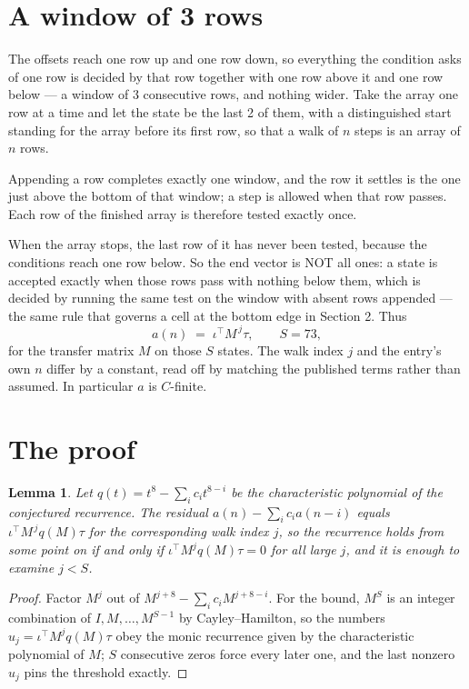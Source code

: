\documentclass[11pt,a4paper]{article}
\theoremstyle{plain}
\newtheorem{lemma}[theorem]{Lemma}
\theoremstyle{definition}
\begin{document}
\section{A window of 3 rows}

The offsets reach one row up and one row down, so everything the condition asks of one row is
decided by that row together with one row above it and one row below --- a window of
$3$ consecutive rows, and nothing wider. Take the array one row at a time and
let the state be the last 2 of them, with a distinguished start standing for the array before its
first row, so that a walk of $n$ steps is an array of $n$ rows.

Appending a row completes exactly one window, and the row it settles is the one just above the bottom of that window; a step is
allowed when that row passes. Each row of the finished array is therefore tested exactly once.

When the array stops, the last row of it has never been tested, because the
conditions reach one row below. So the end vector is NOT all ones: a state is accepted exactly when
those rows pass with nothing below them, which is decided by running the same test on the window
with absent rows appended --- the same rule that governs a cell at the bottom edge in
Section 2.
Thus
\[
a(n)\;=\;\iota^{\!\top}M^{\,j}\tau ,\qquad S=73,
\]
for the transfer matrix $M$ on those $S$ states. The walk index $j$ and the entry's own $n$
differ by a constant, read off by matching the published terms rather than assumed. In
particular $a$ is $C$-finite.

\section{The proof}

\begin{lemma}\label{lem:crit}
Let $q(t)=t^{8}-\sum_i c_it^{8-i}$ be the characteristic polynomial of the
conjectured recurrence. The residual $a(n)-\sum_ic_ia(n-i)$ equals
$\iota^{\!\top}M^{\,j}q(M)\tau$ for the corresponding walk index $j$, so the recurrence
holds from some point on if and only if $\iota^{\!\top}M^{j}q(M)\tau=0$ for all large $j$,
and it is enough to examine $j<S$.
\end{lemma}

\begin{proof}
Factor $M^{j}$ out of $M^{j+8}-\sum_ic_iM^{j+8-i}$. For the bound, $M^{S}$
is an integer combination of $I,M,\dots,M^{S-1}$ by Cayley--Hamilton, so the numbers
$u_j=\iota^{\!\top}M^{j}q(M)\tau$ obey the monic recurrence given by the characteristic
polynomial of $M$; $S$ consecutive zeros force every later one, and the last nonzero $u_j$
pins the threshold exactly.
\end{proof}
\end{document}
